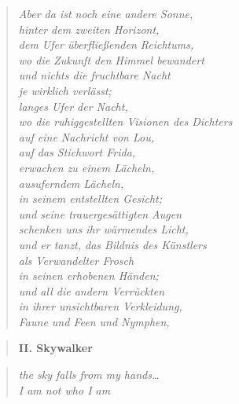 \begin{verse}
\itshape
Aber da ist noch eine andere Sonne,\\
hinter dem zweiten Horizont,\\
dem Ufer überfließenden Reichtums,\\
wo die Zukunft den Himmel bewandert\\
und nichts die fruchtbare Nacht\\
je wirklich verlässt;\\
langes Ufer der Nacht,\\
wo die ruhiggestellten Visionen des Dichters\\
auf eine Nachricht von Lou,\\
auf das Stichwort {\upshape Frida},\\
erwachen zu einem Lächeln,\\
ausuferndem Lächeln,\\
in seinem entstellten Gesicht;\\
und seine trauergesättigten Augen\\
schenken uns ihr wärmendes Licht,\\
und er tanzt, das {\upshape Bildnis des Künstlers\\
als Verwandelter Frosch}\\
in seinen erhobenen Händen;\\
und all die andern Verrückten\\
in ihrer unsichtbaren Verkleidung,\\
Faune und Feen und Nymphen,
\end{verse}

\clearpage

\begin{verse}
{\bfseries II. Skywalker}
\end{verse}

\begin{quote}
\itshape\smaller
the sky falls from my hands\ldots\\
I am not who I am

\end{quote}

